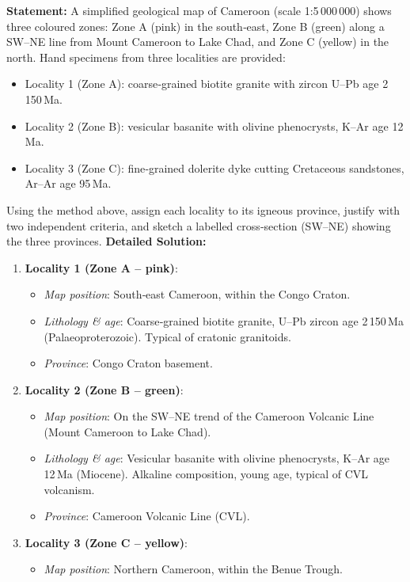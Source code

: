 \documentclass[11pt]{article}
\newcommand{\cle}[1]{{\popxbold\color{popdark}#1}}
\begin{document}
\begin{exoresolu}
\textbf{Statement:} A simplified geological map of Cameroon (scale 1:5\,000\,000) shows three coloured zones: Zone A (pink) in the south‑east, Zone B (green) along a SW–NE line from Mount Cameroon to Lake Chad, and Zone C (yellow) in the north. Hand specimens from three localities are provided:
\begin{itemize}
\item Locality 1 (Zone A): coarse‑grained biotite granite with zircon U–Pb age 2\,150\,Ma.
\item Locality 2 (Zone B): vesicular basanite with olivine phenocrysts, K–Ar age 12\,Ma.
\item Locality 3 (Zone C): fine‑grained dolerite dyke cutting Cretaceous sandstones, Ar–Ar age 95\,Ma.
\end{itemize}
Using the method above, assign each locality to its igneous province, justify with two independent criteria, and sketch a labelled cross‑section (SW–NE) showing the three provinces.
\tcblower
\textbf{Detailed Solution:}
\begin{enumerate}
\item \textbf{Locality 1 (Zone A – pink)}: 
\begin{itemize}
\item \textit{Map position}: South‑east Cameroon, within the Congo Craton.
\item \textit{Lithology \& age}: Coarse‑grained biotite granite, U–Pb zircon age 2\,150\,Ma (Palaeoproterozoic). Typical of cratonic granitoids.
\item \textit{Province}: \cle{Congo Craton basement}.
\end{itemize}
\item \textbf{Locality 2 (Zone B – green)}: 
\begin{itemize}
\item \textit{Map position}: On the SW–NE trend of the Cameroon Volcanic Line (Mount Cameroon to Lake Chad).
\item \textit{Lithology \& age}: Vesicular basanite with olivine phenocrysts, K–Ar age 12\,Ma (Miocene). Alkaline composition, young age, typical of CVL volcanism.
\item \textit{Province}: \cle{Cameroon Volcanic Line (CVL)}.
\end{itemize}
\item \textbf{Locality 3 (Zone C – yellow)}: 
\begin{itemize}
\item \textit{Map position}: Northern Cameroon, within the Benue Trough.

\end{itemize}
\end{enumerate}
\end{exoresolu}
\end{document}
